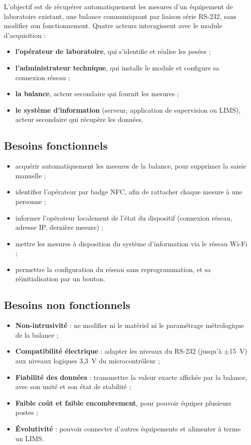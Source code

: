 L'objectif est de récupérer automatiquement les mesures d'un équipement de laboratoire existant, une balance communiquant par liaison série \ac{RS-232}, sans modifier son fonctionnement. Quatre acteurs interagissent avec le module d'acquisition :
\begin{itemize}
    \item \textbf{l'opérateur de laboratoire}, qui s'identifie et réalise les pesées ;
    \item \textbf{l'administrateur technique}, qui installe le module et configure sa connexion réseau ;
    \item \textbf{la balance}, acteur secondaire qui fournit les mesures ;
    \item \textbf{le système d'information} (serveur, application de supervision ou \ac{LIMS}), acteur secondaire qui récupère les données.
\end{itemize}

\subsection{Besoins fonctionnels}
\begin{itemize}
    \item acquérir automatiquement les mesures de la balance, pour supprimer la saisie manuelle ;
    \item identifier l'opérateur par badge \ac{NFC}, afin de rattacher chaque mesure à une personne ;
    \item informer l'opérateur localement de l'état du dispositif (connexion réseau, adresse \ac{IP}, dernière mesure) ;
    \item mettre les mesures à disposition du système d'information via le réseau \ac{Wi-Fi} ;
    \item permettre la configuration du réseau sans reprogrammation, et sa réinitialisation par un bouton.
\end{itemize}

\subsection{Besoins non fonctionnels}
\begin{itemize}
    \item \textbf{Non-intrusivité} : ne modifier ni le matériel ni le paramétrage métrologique de la balance ;
    \item \textbf{Compatibilité électrique} : adapter les niveaux du \ac{RS-232} (jusqu'à $\pm$15~V) aux niveaux logiques 3,3~V du microcontrôleur \citep{tia232} ;
    \item \textbf{Fiabilité des données} : transmettre la valeur exacte affichée par la balance, avec son unité et son état de stabilité ;
    \item \textbf{Faible coût et faible encombrement}, pour pouvoir équiper plusieurs postes ;
    \item \textbf{Évolutivité} : pouvoir connecter d'autres équipements et alimenter à terme un \ac{LIMS}.
\end{itemize}

